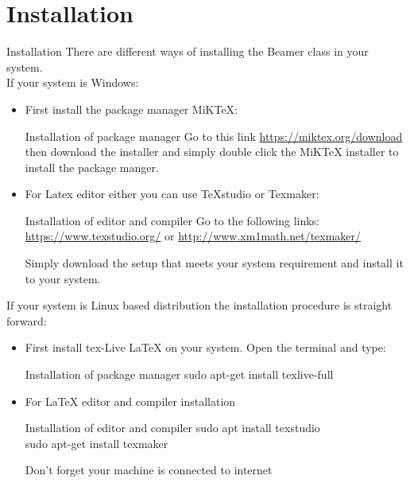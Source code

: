 \documentclass[10pt,xcolor=x11names]{beamer}
\begin{document}
\section{Installation}
\begin{frame}[allowframebreaks]{Installation}
There are different ways of installing the Beamer class in your system.\\

If your system is Windows:

\begin{itemize}
	\item First install the package manager \alert{MiKTeX}:
	
	\begin{exampleblock}{Installation of package manager}
		Go to this link \url{https://miktex.org/download} then download the installer and simply double click the \alert{MiKTeX} installer to install the package manger.
	\end{exampleblock}
	
	\item For Latex editor either you can use \alert{TeXstudio} or \alert{Texmaker}:
	
	\begin{exampleblock}{Installation of editor and compiler}
		Go to the following links:
		\url{https://www.texstudio.org/} or 
		\url{http://www.xm1math.net/texmaker/}
		
		Simply download the setup that meets your system requirement and install it to your system.
		
	\end{exampleblock}

	
\end{itemize}

If your system is Linux based distribution the installation procedure is straight forward:

\begin{itemize}
	\item  First install \alert{tex-Live LaTeX} on your system. Open the terminal and type:
	
	\begin{exampleblock}{Installation of package manager}
		sudo apt-get install texlive-full
	\end{exampleblock}
	\item For LaTeX editor and compiler installation 
	
	\begin{exampleblock}{Installation of editor and compiler}
		sudo apt install texstudio \\
		sudo apt-get install texmaker 
	\end{exampleblock}
	
	\alert{ Don't forget your machine is connected to internet }
\end{itemize}

\end{frame}
\end{document}
